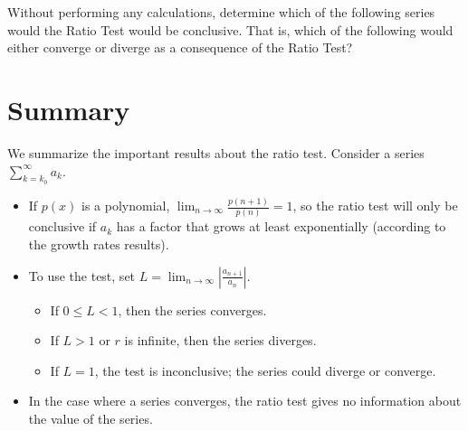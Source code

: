 \documentclass{ximera}
\begin{document}
\begin{image}
  \end{image}

\begin{question}
Without performing any calculations, determine which of the following series would the Ratio Test would be conclusive.  That is, which of the following would either converge or diverge as a consequence of the Ratio Test?
\begin{selectAll}
\end{selectAll}
\end{question}


\section{Summary}
We summarize the important results about the ratio test.  Consider a series $\sum_{k=k_0}^{\infty} a_k$.


\begin{itemize}
\item If $p(x)$ is a polynomial, $\lim_{n \to \infty} \frac{p(n+1)}{p(n)} = 1$, so the ratio test will only be conclusive if $a_k$ has a factor that grows at least exponentially (according to the growth rates results).
\item To use the test, set $L = \lim_{n \to \infty} \left| \frac{a_{n+1}}{a_n} \right|.$ 

\begin{itemize}
  \item If $0 \leq L < 1$, then the series converges.
  \item If $L>1$ or $r$ is infinite, then the series diverges.
  \item If $L = 1$, the test is inconclusive; the series could diverge or converge.
  \end{itemize}

\item In the case where a series converges, the ratio test gives no information about the value of the series.
 \end{itemize}
 
\end{document}
